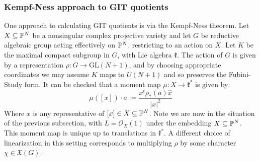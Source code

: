 \subsubsection{Kempf-Ness approach to GIT quotients}
One approach to calculating GIT quotients is via the Kempf-Ness theorem. Let \(X \subseteq \mathbb{P}^N\) be a nonsingular complex projective variety and let \(G\) be reductive algebraic group acting effectively on \(\mathbb{P}^N\), restricting to an action on \(X\). Let \(K\) be the maximal compact subgroup in \(G\), with Lie algebra \(\mathfrak{k}\). The action of \(G\) is given by a representation \(\rho: G \to \text{GL}(N+1)\), and by choosing appropriate coordinates we may assume \(K\) maps to \(U(N+1)\) and so preserves the Fubini-Study form. It can be checked that a moment map \(\mu: X \to \mathfrak{k}^*\) is given by:
\begin{equation}\label{eq:mu}
\mu([x]) \cdot a := \frac{x^t \rho_*(a) \hat{x}}{ |x|^2}
\end{equation}
Where \(x\) is any representative of \([x] \in X \subseteq \mathbb{P}^N\). Note we are now in the situation of the previous subsection, with \(L = \mathcal{O}_X(1)\) under the embedding \(X \subseteq \mathbb{P}^N\). This moment map is unique up to translations in \(\mathfrak{k}^*\). A different choice of linearization in this setting corresponds to multiplying \(\rho\) by some character \(\chi \in \mathfrak{X}(G)\).

